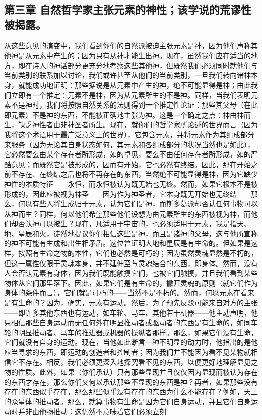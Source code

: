 
\subsection{第三章 自然哲学家主张元素的神性；该学说的荒谬性被揭露。}

从这些意见的演变中，我们看到你们的自然派被迫主张元素是神，因为他们声称其他神是从元素中产生的；因为只有从神才能生出神。现在，虽然我们应在适当的地方，即在诗人的神话部分更充分地考察这些其他神，但既然我们必须同时就他们与当前类别的联系加以讨论，我们或许甚至从他们的当前类别，一旦我们转向诸神本身，就能成功地证明：那些据说是从元素中产生的神，绝不可能显得是神；由此我们立即有一个推定：元素不是神，因为从元素所生的不是神。同样，当我们表明元素不是神时，我们将按照自然关系的法则得到一个推定性论证：那些其父母（在此即元素）不是神的东西，不能被正确地主张为神。这是一个确定之点：神由神而生，缺乏神性者由非神圣者所生。现在，就你们的哲学家所论述的世界而言（因为我将这个术语用于最广泛意义上的世界），它包含元素，并将元素作为其组成部分来服务（因为无论其自身状态如何，其元素和各组成部分的状况当然也是如此），它必然要么由某个存在者所形成，如的卓见，要么不由任何存在者所形成，如的严酷意见；而既然它是被形成的，因而有开始，它也必然有终结。因此，那在开始之前不存在、在终结之后也将不再存在的东西，当然绝不可能显得是神，因为它缺少神性的本质特征——永恒，而永恒被认为既无始也无终。然而，如果它根本不是被形成的，因此应被视为神圣——因为作为神圣者，它本身既无开始也无终结——那么，何以有些人将生成归于元素，认为它们是神，而斯多葛派却否认任何事物可以从神而生？同样，何以他们希望那些他们设想为由元素所生的东西被视为神，而他们却否认神可以被生？现在，凡适用于宇宙的，也必须适用于元素，我是指天、地、星辰和火，徒然地提议你们相信这些是神，而且是诸神的父母，这与他所宣称的神不可能有生成和出生相矛盾。这位曾证明大地和星辰是有生命的。但如果是这样，按照有生命之物的本性，它们也必然是可朽的；因为虽然灵魂显然是不朽的，但这一属性仅限于灵魂本身，并不延伸至与灵魂结合的东西，即身体。然而，没有人会否认元素有身体，因为我们既能触摸它们，也被它们触摸，并且我们看到某些物体从它们那里落下。因此，如果它们是有生命的，撇开灵魂的原则（就它们作为身体的条件而言），它们就是可朽的——当然不是不朽的。然而，何以元素在看来是有生命的？因为，确实，元素有运动。然后，为了预先反驳可能来自对方的主张——即许多其他东西也有运动，如车轮、马车、其他若干机器——他主动声明，他只相信那些自身运动而无任何外在明显推动者或驱动者的东西是有生命的，如同车轮的明显推动者、马车的推进器或机器的操纵者那样。那么，如果它们没有生命，它们就没有自身的运动。现在，当他如此断言一种不明显的动力时，他指出的是他应当寻求的东西，即运动的创造者和控制者；因为我们并不能因为看不见某物就相信它不存在。相反，我们必须更深入地探究看不见的东西，以便更好地理解显见之物的性质。此外，如果（你们承认）只有那些显现并且仅仅因为显现而被认为存在的东西才存在，那么你们又何以承认那些不显现的东西是神？再者，如果那些没有存在的东西似乎存在，那么那些似乎没有存在的东西为什么不能存在？例如，天上的众星体的推动者。那么，就算事物有生命是因为它们自身运动，并且它们自身运动时并非由他物推动：这仍然不意味着它们必须立刻
